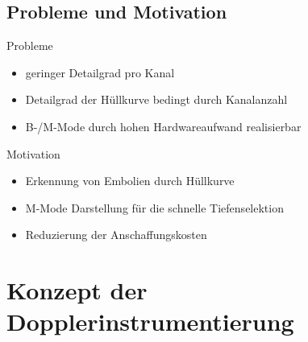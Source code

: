 \documentclass{beamer}
\begin{document}
\subsection{Probleme und Motivation}
\begin{frame}
	\begin{block}{Probleme}
		\begin{itemize}
			\item geringer Detailgrad pro Kanal
			\item Detailgrad der Hüllkurve bedingt durch Kanalanzahl			
			\item B-/M-Mode durch hohen Hardwareaufwand realisierbar
		\end{itemize}
	\end{block}
	\begin{block}{Motivation}
		\begin{itemize}
			\item Erkennung von Embolien durch Hüllkurve
			\item M-Mode Darstellung für die schnelle Tiefenselektion
			\item Reduzierung der Anschaffungskosten
		\end{itemize}
	\end{block}
\end{frame}



\section{Konzept der Dopplerinstrumentierung}
\end{document}
